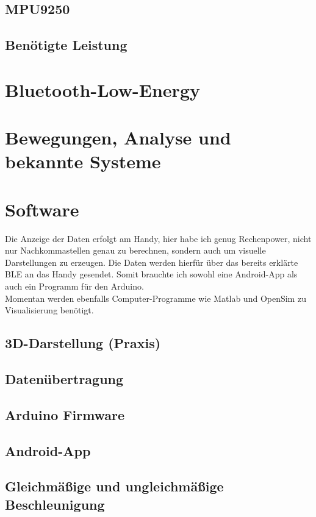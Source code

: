 \documentclass[11pt, titlepage, parskip=half-]{scrreprt}
\begin{document}
\section{MPU9250}

\section{Benötigte Leistung}


\chapter{Bluetooth-Low-Energy}


\chapter{Bewegungen, Analyse und bekannte Systeme}


\chapter{Software}
Die Anzeige der Daten erfolgt am Handy, hier habe ich genug Rechenpower,
nicht nur Nachkommastellen genau zu berechnen, sondern auch um 
visuelle Darstellungen zu erzeugen. Die Daten werden hierfür über das bereits
erklärte BLE an das Handy gesendet.
Somit brauchte ich sowohl eine Android-App als auch ein Programm für den Arduino. \\ 
Momentan werden ebenfalls Computer-Programme wie Matlab und OpenSim zu Visualisierung benötigt.
\section{3D-Darstellung (Praxis)}

\section{Datenübertragung}

\section{Arduino Firmware}

\section{Android-App}

\section{Gleichmäßige und ungleichmäßige Beschleunigung}

\end{document}
